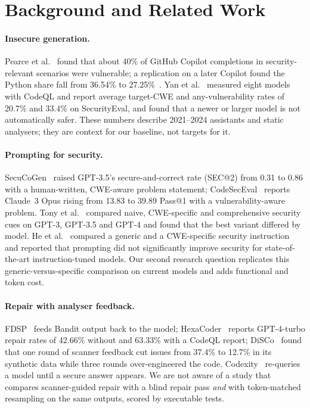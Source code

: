 \section{Background and Related Work}\label{sec:related}

\paragraph{Insecure generation.} Pearce et al.~\cite{pearce2022asleep} found that about 40\% of GitHub Copilot
completions in security-relevant scenarios were vulnerable; a replication on a later Copilot found the Python share
fall from 36.54\% to 27.25\%~\cite{majdinasab2023replication}. Yan et al.~\cite{yan2025guiding} measured eight
models with CodeQL and report average target-CWE and any-vulnerability rates of 20.7\% and 33.4\% on SecurityEval,
and found that a newer or larger model is not automatically safer. These numbers describe 2021--2024 assistants and
static analysers; they are context for our baseline, not targets for it.

\paragraph{Prompting for security.} SecuCoGen~\cite{wang2023secucogen} raised GPT-3.5's secure-and-correct rate
(SEC@2) from 0.31 to 0.86 with a human-written, CWE-aware problem statement; CodeSecEval~\cite{wang2024codeseceval}
reports Claude~3 Opus rising from 13.83 to 39.89 Pass@1 with a vulnerability-aware problem. Tony
et al.~\cite{tony2024prompting} compared naive, CWE-specific and comprehensive security cues on GPT-3, GPT-3.5 and
GPT-4 and found that the best variant differed by model. He et al.~\cite{he2024safecoder} compared a generic and a
CWE-specific security instruction and reported that prompting did not significantly improve security for
state-of-the-art instruction-tuned models. Our second research question replicates this generic-versus-specific
comparison on current models and adds functional and token cost.

\paragraph{Repair with analyser feedback.} FDSP~\cite{alrashedy2023fdsp} feeds Bandit output back to the model;
HexaCoder~\cite{hajipour2024hexacoder} reports GPT-4-turbo repair rates of 42.66\% without and 63.33\% with a
CodeQL report; DiSCo~\cite{hasan2025disco} found that one round of scanner feedback cut issues from 37.4\% to
12.7\% in its synthetic data while three rounds over-engineered the code. Codexity~\cite{kim2024codexity}
re-queries a model until a secure answer appears. We are not aware of a study that compares scanner-guided repair
with a blind repair pass \emph{and} with token-matched resampling on the same outputs, scored by executable tests.

